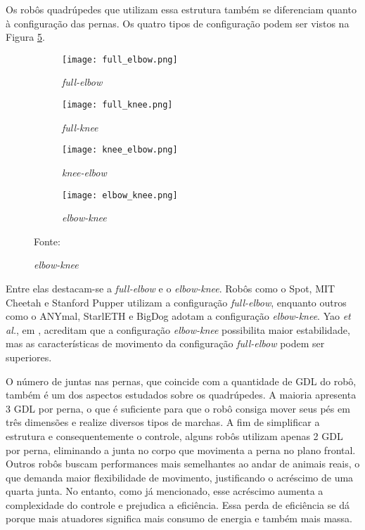 \documentclass[../main.tex]{subfiles}
\begin{document}
Os robôs quadrúpedes que utilizam essa estrutura também se diferenciam quanto à configuração das pernas. Os quatro tipos de configuração podem ser vistos na Figura \ref{fig:joint_configurations}.

\begin{figure}[h]
  \centering
  \caption{Tipos de configuração de pernas para robôs com estrutura tipo mamífero.}
  \begin{subfigure}[t]{0.24\textwidth}
    \centering
    \texttt{[image: full\_elbow.png]}
    \caption{\textit{full-elbow}}
    \label{fig:joint_configurations_a}
  \end{subfigure}
  \begin{subfigure}[t]{0.24\textwidth}
    \centering
    \texttt{[image: full\_knee.png]}
    \caption{\textit{full-knee}}
    \label{fig:joint_configurations_b}
  \end{subfigure}
  \begin{subfigure}[t]{0.24\textwidth}
    \centering
    \texttt{[image: knee\_elbow.png]}
    \caption{\textit{knee-elbow}}
    \label{fig:joint_configurations_c}
  \end{subfigure}
  \begin{subfigure}[t]{0.24\textwidth}
    \centering
    \texttt{[image: elbow\_knee.png]}
    \caption{\textit{elbow-knee}}
    \label{fig:joint_configurations_d}
  \end{subfigure}

  Fonte: \cite{Yao2021}
  \label{fig:joint_configurations}
\end{figure}

Entre elas destacam-se a \textit{full-elbow} e o \textit{elbow-knee}. Robôs como o Spot, MIT Cheetah e Stanford Pupper utilizam a configuração \textit{full-elbow}, enquanto outros como o ANYmal, StarlETH e BigDog adotam a configuração  \textit{elbow-knee}. Yao \textit{et al.}, em \cite{Yao2021}, acreditam que a configuração \textit{elbow-knee} possibilita maior estabilidade, mas as características de movimento da configuração \textit{full-elbow} podem ser superiores.

O número de juntas nas pernas, que coincide com a quantidade de GDL do robô, também é um dos aspectos estudados sobre os quadrúpedes. A maioria apresenta 3 GDL por perna, o que é suficiente para que o robô consiga mover seus pés em três dimensões e realize diversos tipos de marchas. A fim de simplificar a estrutura e consequentemente o controle, alguns robôs utilizam apenas 2 GDL por perna, eliminando a junta no corpo que movimenta a perna no plano frontal. Outros robôs buscam performances mais semelhantes ao andar de animais reais, o que demanda maior flexibilidade de movimento, justificando o acréscimo de uma quarta junta. No entanto, como já mencionado, esse acréscimo aumenta a complexidade do controle e prejudica a eficiência. Essa perda de eficiência se dá porque mais atuadores significa mais consumo de energia e também mais massa.
\end{document}
